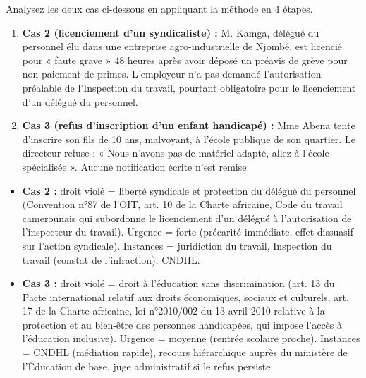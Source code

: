 \documentclass[11pt]{article}
\begin{document}
\begin{exercice}
Analysez les deux cas ci-dessous en appliquant la méthode en 4 étapes.
\begin{enumerate}
    \item \textbf{Cas 2 (licenciement d'un syndicaliste) :} M. Kamga, délégué du personnel élu dans une entreprise agro-industrielle de Njombé, est licencié pour « faute grave » 48 heures après avoir déposé un préavis de grève pour non-paiement de primes. L'employeur n'a pas demandé l'autorisation préalable de l'Inspection du travail, pourtant obligatoire pour le licenciement d'un délégué du personnel.
    \item \textbf{Cas 3 (refus d'inscription d'un enfant handicapé) :} Mme Abena tente d'inscrire son fils de 10 ans, malvoyant, à l'école publique de son quartier. Le directeur refuse : « Nous n'avons pas de matériel adapté, allez à l'école spécialisée ». Aucune notification écrite n'est remise.
\end{enumerate}
\end{exercice}

\begin{corrige}[Exercice n°1]
\begin{itemize}
    \item \textbf{Cas 2 :} droit violé = liberté syndicale et protection du délégué du personnel (Convention n°87 de l'OIT, art. 10 de la Charte africaine, Code du travail camerounais qui subordonne le licenciement d'un délégué à l'autorisation de l'inspecteur du travail). Urgence = forte (précarité immédiate, effet dissuasif sur l'action syndicale). Instances = juridiction du travail, Inspection du travail (constat de l'infraction), CNDHL.
    \item \textbf{Cas 3 :} droit violé = droit à l'éducation sans discrimination (art. 13 du Pacte international relatif aux droits économiques, sociaux et culturels, art. 17 de la Charte africaine, loi n°2010/002 du 13 avril 2010 relative à la protection et au bien-être des personnes handicapées, qui impose l'accès à l'éducation inclusive). Urgence = moyenne (rentrée scolaire proche). Instances = CNDHL (médiation rapide), recours hiérarchique auprès du ministère de l'Éducation de base, juge administratif si le refus persiste.
\end{itemize}
\end{corrige}
\end{document}
